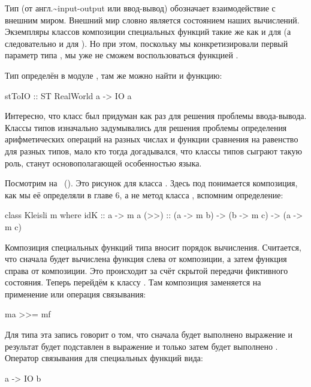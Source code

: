 Тип  (от англ.\textasciitilde{}input-output или ввод-вывод)
обозначает взаимодействие с внешним миром. Внешний мир словно является
состоянием наших вычислений. Экземпляры классов композиции специальных
функций такие же как и для  (а следовательно и для ).
Но при этом, поскольку мы конкретизировали первый параметр типа ,
мы уже не сможем воспользоваться функцией .

Тип  определён в модуле , там же
можно найти и функцию:


\begin{code}
stToIO :: ST RealWorld a -> IO a
\end{code}

Интересно, что класс  был придуман как раз для решения
проблемы ввода-вывода. Классы типов изначально задумывались для решения
проблемы определения арифметических операций на разных числах и функции
сравнения на равенство для разных типов, мало кто тогда догадывался, что
классы типов сыграют такую роль, станут основополагающей особенностью
языка.


Посмотрим на ~(). Это рисунок для класса . Здесь
под \In{>>} понимается композиция, как мы её определяли в главе 6, а не
метод класса , вспомним определение:


\begin{code}
class Kleisli m where
    idK  :: a -> m a
    (>>) :: (a -> m b) -> (b -> m c) -> (a -> m c)
\end{code}

Композиция специальных функций типа  вносит порядок
вычисления. Считается, что сначала будет вычислена функция слева от
композиции, а затем функция справа от композиции. Это происходит за счёт
скрытой передачи фиктивного состояния. Теперь перейдём к классу
. Там композиция заменяется на применение или операция
связывания:


\begin{code}
ma >>= mf
\end{code}

Для типа  эта запись говорит о том, что сначала будет выполнено
выражение  и результат будет подставлен в выражение  и
только затем будет выполнено . Оператор связывания для
специальных функций вида:


\begin{code}
a -> IO b
\end{code}

